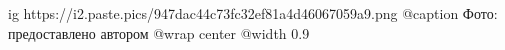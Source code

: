  
 
 
 
 

\ifcmt
  ig https://i2.paste.pics/947dac44c73fc32ef81a4d46067059a9.png
	@caption Фото: предоставлено автором
  @wrap center
  @width 0.9
\fi

